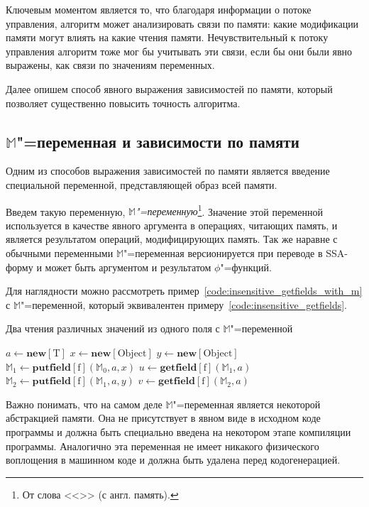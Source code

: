 \documentclass[14pt,titlepage,draft]{extarticle}
\newcommand{\M}{\ensuremath{\mathbb{M}}}
\let\mathphi\phi
\renewcommand{\phi}{\ensuremath{\mathphi}}
\newcommand{\type}[1]{\mathrm{#1}}
\newcommand{\field}[1]{\mathrm{#1}}
\newcommand{\op}[1]{\mathbf{#1}}
\begin{document}
    Ключевым моментом является то, что благодаря информации о потоке
    управления, алгоритм может анализировать связи по памяти: какие модификации
    памяти могут влиять на какие чтения памяти. Нечувствительный к потоку
    управления алгоритм тоже мог бы учитывать эти связи, если бы они были явно
    выражены, как связи по значениям переменных.

    Далее опишем способ явного выражения зависимостей по памяти, который
    позволяет существенно повысить точность алгоритма.

  \subsection{\texorpdfstring{\M}{M}"=переменная и зависимости по памяти}

    Одним из способов выражения зависимостей по памяти является введение
    специальной переменной, представляющей образ всей памяти.

    Введем такую переменную, \emph{\M"=переменную}\footnote{
      От слова <<>> (с англ. память).
    }.
    Значение этой переменной используется в качестве явного аргумента в
    операциях, читающих память, и является результатом операций, модифицирующих
    память. Так же наравне с обычными переменными \M"=переменная версионируется
    при переводе в SSA-форму и может быть аргументом и результатом
    \phi"=функций.

    Для наглядности можно рассмотреть
    пример~\ref{code:insensitive_getfields_with_m} с \M"=переменной, который
    эквивалентен примеру~\ref{code:insensitive_getfields}.

    \begin{algorithm}
      \caption{Два чтения различных значений из одного поля с \M"=переменной}
      \label{code:insensitive_getfields_with_m}
      \begin{algorithmic}[1]
        \State $a \gets \op{new}[\type{T}]$
        \State $x \gets \op{new}[\type{Object}]$
        \State $y \gets \op{new}[\type{Object}]$
        \State $\M_1 \gets \op{putfield}[\field{f}](\M_0, a, x)$
        \State $u \gets \op{getfield}[\field{f}](\M_1, a)$
        \State $\M_2 \gets \op{putfield}[\field{f}](\M_1, a, y)$
        \State $v \gets \op{getfield}[\field{f}](\M_2, a)$
      \end{algorithmic}
    \end{algorithm}

    Важно понимать, что на самом деле \M"=переменная является некоторой
    абстракцией памяти. Она не присутствует в явном виде в исходном коде
    программы и должна быть специально введена на некотором этапе компиляции
    программы. Аналогично эта переменная не имеет никакого физического
    воплощения в машинном коде и должна быть удалена перед кодогенерацией.
\end{document}
